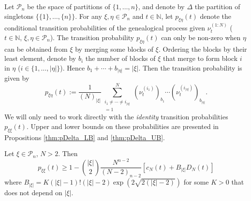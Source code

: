 Let $\mathcal{P}_n$ be the space of partitions of $\{1,\dots,n\}$, and denote by $\Delta$ the partition of singletons $\{ \{1\},\dots, \{n\} \}$.
For any $\xi, \eta \in \mathcal{P}_n$ and $t\in\mathbb{N}$, let $p_{\xi\eta}(t)$ denote the conditional transition probabilities of the genealogical process given $\nu_t^{(1:N)}$ ($t\in\mathbb{N}$, $\xi, \eta \in \mathcal{P}_n$).
The transition probability $p_{\xi\eta}(t)$ can only be non-zero when $\eta$ can be obtained from $\xi$ by merging some blocks of $\xi$.
Ordering the blocks by their least element, denote by $b_i$ the number of blocks of $\xi$ that merge to form block $i$ in $\eta$ ($i \in \{1,\dots, |\eta|\}$). Hence $b_1 + \cdots + b_{|\eta|} = |\xi|$.
Then the transition probability is given by
\begin{equation}\label{eq:defn_pxieta}
p_{\xi\eta}(t) 
:= \frac{1}{(N)_{|\xi|}} \sum_{\substack{i_1 \neq \cdots \neq i_{|\eta|} \\ =1}}^N
        (\nu_t^{(i_1)})_{b_1} \cdots (\nu_t^{(i_{|\eta|})})_{b_{|\eta|}} .
\end{equation}
We will only need to work directly with the \emph{identity} transition probabilities $p_{\xi\xi}(t)$.
Upper and lower bounds on these probabilities are presented in Propositions \ref{thm:pDelta_LB} and \ref{thm:pDelta_UB}.
\begin{prop}\label{thm:pDelta_LB}
Let $\xi \in \mathcal{P}_n$, $N>2$. Then
\begin{equation*}
p_{\xi\xi}(t)
\geq 1 - \binom{|\xi|}{2} \frac{N^{n-2}}{(N-2)_{n-2}} \left[ c_N(t) + B_{|\xi|} D_N(t) \right]
\end{equation*}
where $B_{|\xi|} = K (|\xi|-1)! (|\xi|-2) \exp( 2 \sqrt{2(|\xi|-2)} )$ for some $K>0$ that does not depend on $|\xi|$.
\end{prop}
